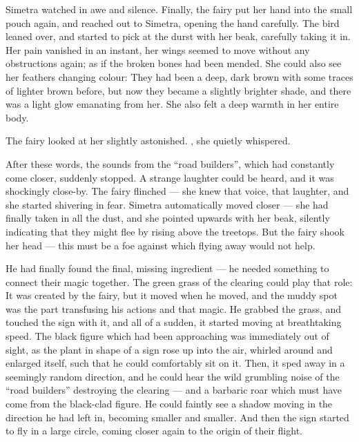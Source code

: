 Simetra watched in awe and silence. Finally, the fairy put her hand into the small pouch again, and reached out to Simetra, opening the hand carefully. The bird leaned over, and started to pick at the durst with her beak, carefully taking it in. Her pain vanished in an instant, her wings seemed to move without any obstructions again; as if the broken bones had been mended. She could also see her feathers changing colour: They had been a deep, dark brown with some traces of lighter brown before, but now they became a slightly brighter shade, and there was a light glow emanating from her. She also felt a deep warmth in her entire body.

The fairy looked at her slightly astonished. , she quietly whispered. 

After these words, the sounds from the \enquote{road builders}, which had constantly come closer, suddenly stopped. A strange laughter could be heard, and it was shockingly close-by. The fairy flinched --- she knew that voice, that laughter, and she started shivering in fear. Simetra automatically moved closer --- she had finally taken in all the dust, and she pointed upwards with her beak, silently indicating that they might flee by rising above the treetops. But the fairy shook her head --- this must be a foe against which flying away would not help.

\fancybreaker{}

He had finally found the final, missing ingredient --- he needed something to connect their magic together. The green grass of the clearing could play that role: It was created by the fairy, but it moved when he moved, and the muddy spot was the part transfusing his actions and that magic. He grabbed the grass, and touched the sign with it, and all of a sudden, it started moving at breathtaking speed. The black figure which had been approaching was immediately out of sight, as the plant in shape of a sign rose up into the air, whirled around and enlarged itself, such that he could comfortably sit on it. Then, it sped away in a seemingly random direction, and he could hear the wild grumbling noise of the \enquote{road builders} destroying the clearing --- and a barbaric roar which must have come from the black-clad figure. He could faintly see a shadow moving in the direction he had left in, becoming smaller and smaller. And then the sign started to fly in a large circle, coming closer again to the origin of their flight.

